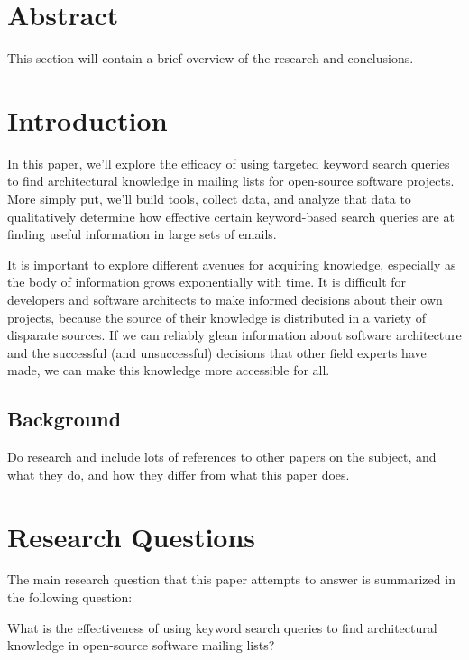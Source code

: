 \documentclass[a4paper, 12pt]{article}
\begin{document}


\section{Abstract}
	This section will contain a brief overview of the research and conclusions.



\section{Introduction}
	In this paper, we'll explore the efficacy of using targeted keyword search queries to find architectural knowledge in mailing lists for open-source software projects. More simply put, we'll build tools, collect data, and analyze that data to qualitatively determine how effective certain keyword-based search queries are at finding useful information in large sets of emails.
	
	It is important to explore different avenues for acquiring knowledge, especially as the body of information grows exponentially with time. It is difficult for developers and software architects to make informed decisions about their own projects, because the source of their knowledge is distributed in a variety of disparate sources. If we can reliably glean information about software architecture and the successful (and unsuccessful) decisions that other field experts have made, we can make this knowledge more accessible for all.
	
	\subsection{Background}
		Do research and include lots of references to other papers on the subject, and what they do, and how they differ from what this paper does.

\section{Research Questions}
	The main research question that this paper attempts to answer is summarized in the following question:
	
	\begin{center}
		\large What is the effectiveness of using keyword search queries to find architectural knowledge in open-source software mailing lists?
	\end{center}
	
\end{document}
